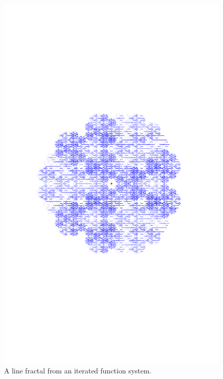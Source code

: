 \documentclass[../notebook.tex]{subfiles}
\begin{document}
\begin{figure}[ht]
  \centering
  \includegraphics{../python-notebooks/linefractal.pdf}
  \caption{A line fractal from an iterated function system.}\label{fig:linefractal}
\end{figure}
\end{document}
